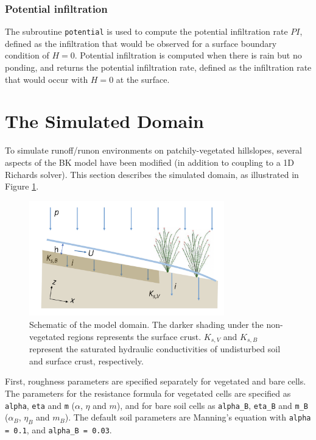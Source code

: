 \documentclass{article}
\newcommand{\code}[1]{\texttt{#1}}
\begin{document}
\subsubsection*{Potential infiltration}

The subroutine \code{potential} is used to compute the potential infiltration rate $PI$, defined as the infiltration that would be observed for a surface boundary condition of $H=0$. 
Potential infiltration is computed when there is rain but no ponding, and returns the potential infiltration rate, defined as the infiltration rate that would occur with $H=0$ at the surface.  




\section{The Simulated Domain}

To simulate runoff/runon environments on patchily-vegetated hillslopes, several aspects of the BK model have been modified (in addition to coupling to a 1D Richards solver).  This section describes the simulated domain, as illustrated in Figure \ref{domain_schematic}.

 \begin{figure}[h]
 \centering
\includegraphics[width=20pc]{grid/domain_schematic.png}
 \caption{Schematic of the model domain.  The darker shading under the non-vegetated regions represents the surface crust.  $K_{s,V}$ and $K_{s,B}$  represent the saturated hydraulic conductivities of undisturbed soil and surface crust, respectively.}
 \label{domain_schematic}
 \end{figure}
 
 
First,  roughness parameters are specified separately for vegetated and bare cells. 
 The parameters for the resistance formula for vegetated cells are specified as  \code{alpha}, \code{eta} and \code{m}  ($\alpha$, $\eta$ and $m$), and for bare soil cells as  \code{alpha\_B}, \code{eta\_B} and \code{m\_B}  ($\alpha_B$, $\eta_B$ and $m_B$).
  The default soil parameters are Manning's equation with \code{alpha = 0.1}, and \code{alpha\_B = 0.03}.
\end{document}
